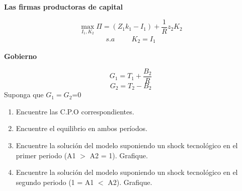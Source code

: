 \documentclass[a4paper,12pt]{article}
\begin{document}
\textbf{Las firmas productoras de capital}

\begin{equation*}
\max_{I_1, K_2}\Pi =(Z_1k_1-I_1)+\frac{1}{R}z_2K_2
\end{equation*}
\begin{align*}
    s.a \hspace{1cm} K_2=I_1
\end{align*}

\textbf{Gobierno}

\begin{equation*}
    G_1= T_1 + \frac{B_2}{R}
\end{equation*}
\begin{equation*}
    G_2= T_2 - B_2
\end{equation*}
Suponga que $G_1=G_2$=0

\begin{enumerate}[label=\alph*)]
 \item Encuentre las C.P.O correspondientes. 
 \item Encuentre el equilibrio en ambos períodos.
    \item Encuentre la solución del modelo suponiendo un shock tecnológico en el primer periodo
(A1 $>$ A2 = 1). Grafique.

 \item Encuentre la solución del modelo suponiendo un shock tecnológico en el segundo periodo
(1 = A1 $<$ A2). Grafique.
\end{enumerate}
\end{document}
